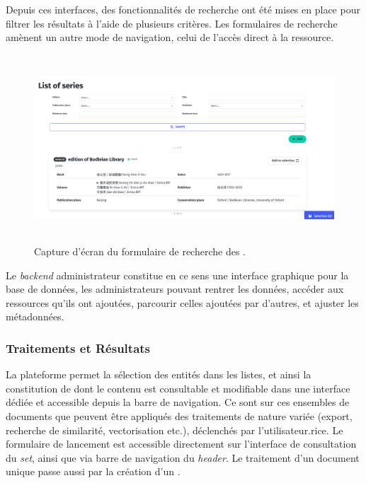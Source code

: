 Depuis ces interfaces, des fonctionnalités de recherche ont été mises en
place pour filtrer les résultats à l'aide de plusieurs critères. Les
formulaires de recherche amènent un autre mode de navigation, celui de
l'accès direct à la ressource.

\begin{figure}[H]
	\begin{center}
		\includegraphics[height=7cm]{figues/serie_form_list.png}
	\end{center}
	\caption{Capture d'écran du formulaire de recherche des \sers.}
	\label{fig:form_recherche} \end{figure}

Le \textit{backend} administrateur constitue en ce sens une interface graphique
pour la base de données, les administrateurs pouvant rentrer les
données, accéder aux ressources qu'ils ont ajoutées, parcourir celles
ajoutées par d'autres, et ajuster les métadonnées.

\hypertarget{traitements-et-resultats}{%
\subsubsection{Traitements et Résultats}\label{traitements-et-resultats}}

La plateforme permet la sélection des entités dans les listes, et ainsi
la constitution de \dss dont le contenu est consultable et
modifiable dans une interface dédiée et accessible depuis la barre de
navigation. Ce sont sur ces ensembles de documents que peuvent être
appliqués des traitements de nature variée (export, recherche de
similarité, vectorisation etc.), déclenchés par l'utilisateur.rice. Le
formulaire de lancement est accessible directement sur l'interface de
consultation du \emph{set}, ainsi que via barre de navigation du \textit{header}. Le
traitement d'un document unique passe aussi par la création d'un \ds.

